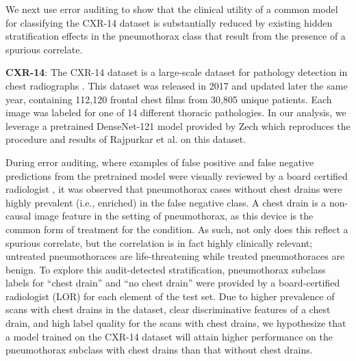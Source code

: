 \documentclass[sigconf,anonymous,review]{acmart}
\begin{document}
We next use error auditing to show that the clinical utility of a common model for classifying the CXR-14 dataset is substantially reduced by existing hidden stratification effects in the pneumothorax class that result from the presence of a spurious correlate.

\textbf{CXR-14}: The CXR-14 dataset is a large-scale dataset for pathology detection in chest radiographs \citep{Wang2017-vm}. 
This dataset was released in 2017 and updated later the same year, containing 112,120 frontal chest films from 30,805 unique patients. 
Each image was labeled for one of 14 different thoracic pathologies.  
In our analysis, we leverage a pretrained DenseNet-121 model provided by Zech \citep{Zech_undated-cw} which reproduces the procedure and results of Rajpurkar et al. \citep{Rajpurkar2018-gc} on this dataset.  

During error auditing, where examples of false positive and false negative predictions from the pretrained model were visually reviewed by a board certified radiologist \citep{Oakden-Rayner2019-yi},
it was observed that pneumothorax cases without chest drains were highly prevalent (i.e., enriched) in the false negative class.
A chest drain is a non-causal image feature in the setting of pneumothorax, as this device is the common form of treatment for the condition. 
As such, not only does this reflect a spurious correlate, but the correlation is in fact highly clinically relevant; untreated pneumothoraces are life-threatening while treated pneumothoraces are benign.
 To explore this audit-detected stratification, pneumothorax subclass labels for ``chest drain'' and ``no chest drain'' were provided by a board-certified radiologist (LOR) for each element of the test set.  
 Due to higher prevalence of scans with chest drains in the dataset, clear discriminative features of a chest drain, and high label quality for the scans with chest drains, we hypothesize that a model trained on the CXR-14 dataset will attain higher performance on the pneumothorax subclass with chest drains than that without chest drains.  
 
\end{document}
